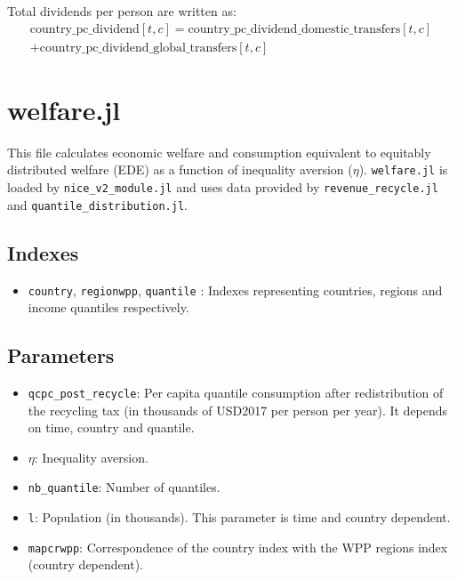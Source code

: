 \documentclass[
]{article}
\providecommand{\tightlist}{%
  \setlength{\itemsep}{0pt}\setlength{\parskip}{0pt}}
\begin{document}
Total dividends per person are written as:
\begin{multline}
 \text{country\_pc\_dividend}[t,c] = \text{country\_pc\_dividend\_domestic\_transfers}[t,c] \\ 
 + \text{country\_pc\_dividend\_global\_transfers}[t,c]
\end{multline}


\section{welfare.jl}\label{welfare.jl}

This file calculates economic welfare and consumption equivalent to
equitably distributed welfare (EDE) as a function of inequality aversion
(\(\eta\)). \texttt{welfare.jl} is loaded by
\texttt{nice\_v2\_module.jl} and uses data provided by
\texttt{revenue\_recycle.jl} and \texttt{quantile\_distribution.jl}.

\subsection{Indexes}\label{indexes-4}

\begin{itemize}
\tightlist
\item
  \texttt{country}, \texttt{regionwpp}, \texttt{quantile} : Indexes
  representing countries, regions and income quantiles respectively.
\end{itemize}

\subsection{Parameters}\label{parameters-7}

\begin{itemize}
\tightlist
\item
  \texttt{qcpc\_post\_recycle}: Per capita quantile consumption after
  redistribution of the recycling tax (in thousands of USD2017 per
  person per year). It depends on time, country and quantile.
\item
  \(\eta\): Inequality aversion.
\item
  \texttt{nb\_quantile}: Number of quantiles.
\item
  \texttt{l}: Population (in thousands). This parameter is time and country dependent.
\item
  \texttt{mapcrwpp}: Correspondence of the country index with the WPP
  regions index (country dependent).
\end{itemize}
\end{document}
